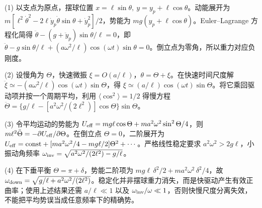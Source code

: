 (1) 以支点为原点，摆球位置 \(x=\ell\sin\theta,\ y=y_p+\ell\cos\theta\)。动能展开为 \(m[\ell^2\dot\theta^2-2\ell\dot y_p\dot\theta\sin\theta+\dot y_p^2]/2\)，势能为 \(mg(y_p+\ell\cos\theta)\)。Euler--Lagrange 方程化简得 \(\ddot\theta-(g+\ddot y_p)\sin\theta/\ell=0\)，即 \(\ddot\theta-g\sin\theta/\ell+(a\omega^2/\ell)\cos(\omega t)\sin\theta=0\)。倒立点为零角，所以重力对应负刚度。

(2) 设慢角为 \(\Theta\)，快速微振 \(\xi=O(a/\ell)\)，\(\theta=\Theta+\xi\)。在快速时间尺度解 \(\ddot\xi\simeq-(a\omega^2/\ell)\cos(\omega t)\sin\Theta\)，得 \(\xi\simeq(a/\ell)\cos(\omega t)\sin\Theta\)。将它乘回驱动项并按一个周期平均，利用 \(\langle\cos^2\rangle=1/2\) 得慢方程 \(\ddot\Theta=\{g/\ell-[a^2\omega^2/(2\ell^2)]\cos\Theta\}\sin\Theta\)。

(3) 令平均运动的势能为 \(U_{\rm eff}=mg\ell\cos\Theta+ma^2\omega^2\sin^2\Theta/4\)，则 \(m\ell^2\ddot\Theta=-\partial U_{\rm eff}/\partial\Theta\)。在倒立点 \(\Theta=0\)，二阶展开为 \(U_{\rm eff}=\mathrm{const}+[ma^2\omega^2/4-mg\ell/2]\Theta^2+\cdots\)。严格线性稳定要求 \(a^2\omega^2>2g\ell\)，小振动角频率 \(\omega_{\rm inv}=\sqrt{a^2\omega^2/(2\ell^2)-g/\ell}\)。

(4) 在下垂平衡 \(\Theta=\pi+\delta\)，势能二阶项为 \(mg\ell\,\delta^2/2+ma^2\omega^2\,\delta^2/4\)，故 \(\omega_{\rm down}=\sqrt{g/\ell+a^2\omega^2/(2\ell^2)}\)。稳定化并非摆球重力消失，而是快驱动产生有效正曲率；使用上述结果还需 \(a/\ell\ll1\) 以及 \(\omega_{\rm inv}/\omega\ll1\)，否则快慢尺度分离失效，不能把平均势误当成任意频率下的精确势。
